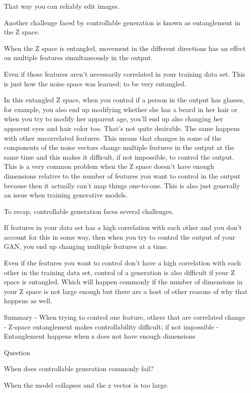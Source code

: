 \documentclass[11pt, onecolumn]{article}
\begin{document}
That way you can reliably edit images.

Another challenge faced by controllable generation is known as entanglement in the Z space.

When the Z space is entangled, movement in the different directions has an effect on multiple features simultaneously in the output.

Even if those features aren't necessarily correlated in your training data set. This is just how the noise space was learned; to be very entangled.

In this entangled Z space, when you control if a person in
the output has glasses, for example,
you also end up modifying whether she has a beard in
her hair or when you try to modify her apparent age,
you'll end up also changing
her apparent eyes and hair color too.
That's not quite desirable.
The same happens with other uncorrelated features.
This means that changes in some of
the components of the noise vectors change
multiple features in the output
at the same time and this makes it difficult,
if not impossible, to control the output.
This is a very common problem when
the Z space doesn't have enough dimensions relative to
the number of features you want to
control in the output because
then it actually can't map things one-to-one.
This is also just generally
an issue when training generative models.

To recap, controllable generation faces several challenges.

If features in your data set has a high correlation with each other and you don't account for this in some way,
then when you try to control the output of your GAN, you end up changing multiple features at a time.

Even if the features you want to control don't have
a high correlation with each
other in the training data set,
control of a generation is also
difficult if your Z space is entangled.
Which will happen commonly if
the number of dimensions in your Z space is not
large enough but there are a host
of other reasons of why that happens as well. 

Summary
- When trying to control one feature, others that are correlated change
- Z-space entanglement makes controllability difficult; if not impossible
- Entanglement happens when z does not have enough dimensions 


Question

When does controllable generation commonly fail?

When the model collapses and the z vector is too large.
\end{document}
